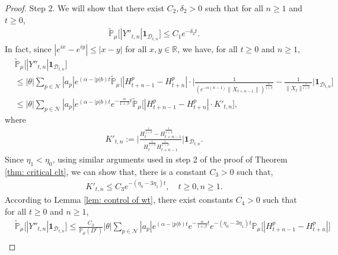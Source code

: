 \documentclass[12pt,a4paper]{amsart}
\theoremstyle{plain}
\theoremstyle{definition}
\numberwithin{equation}{section}
\begin{document}
\begin{proof}
    Step 2.
    We will show that there exist $C_2,\delta_2 > 0$ such that for all $n\geq 1$ and $t\geq 0$,
\begin{align}
\label{thm12211}
    \mathbb{\tilde{P}}_{\mu}\big[|Y''_{t,n}|\mathbf{1}_{\mathcal{D}_{t,n}}\big]\leq C_1e^{-\delta_2 t}.
\end{align}
    In fact, since $|e^{ix}-e^{iy}|\leq|x-y|$ for all $x,y\in \mathbb R$, we have, for all $t \geq 0$ and $n\geq 1$,
\begin{align}\label{large: used next}
    &\tilde{\mathbb{P}}_{\mu}\big[|Y''_{t,n}|\mathbf{1}_{\mathcal{D}_{t,n}}\big]\\
    &\leq |\theta|\sum_{p\in\mathcal{N}}|a_p|e^{(\alpha-|p|b)t}\tilde{\mathbb{P}}_{\mu}\Big[|H_{t+n-1}^p-H_{t+n}^p|\cdot\Big|\frac{1}{(e^{-\alpha(n-1)}\|X_{t+n-1}\|)^{\frac{1}{1+\beta}}}-\frac{1}{\|X_t\|^{\frac{1}{1+\beta}}}\Big|\mathbf{1}_{\mathcal{D}_{t,n}}\Big]\\
    &\leq |\theta|\sum_{p\in\mathcal{N}}|a_p|e^{(\alpha-|p|b)t}e^{-\frac{\alpha}{1+\beta}t}\tilde{\mathbb{P}}_{\mu}\Big[|H_{t+n-1}^p-H_{t+n}^p|\cdot K'_{t,n}\Big],
\end{align}
    where
\begin{align}
    K'_{t,n}
    :=\Big|\frac{H_t^{\frac{1}{1+\beta}}-H_{t+n-1}^{\frac{1}{1+\beta}}}{H_t^{\frac{1}{1+\beta}}H_{t+n-1}^{\frac{1}{1+\beta}}}\Big|\mathbf{1}_{\mathcal{D}_{t,n}}.
\end{align}
Since $\eta_1 < \eta_0$,  using similar arguments used in  step 2 of the proof of Theorem \ref{thm: critical clt}, we can show that, there is a constant $C_3> 0$ such that,
\begin{align}
\label{ineq: control of Kkt1}
     K'_{t,n}
     \leq C_3 e^{-(\eta_0 - 3\eta_1) t},
     \quad t \geq 0, n\geq 1.
\end{align}
    According to Lemma \ref{lem: control of wt}, there exist constants $C_4>0$ such that  for all $t\geq 0$ and $n\geq 1$,
\begin{align}\label{ineq:used next 2}
    &\tilde{\mathbb{P}}_{\mu}\big[|Y''_{t,n}|\mathbf{1}_{\mathcal{D}_{t,n}}\big]
    \leq \frac{C_3}{\mathbb{P}_{\mu}(D^c)} |\theta|\sum_{p\in\mathcal{N}}|a_p|e^{(\alpha-|p|b)t}e^{-\frac{\alpha}{1+\beta}t}e^{-(\eta_0-3\eta_1)t}\mathbb{P}_{\mu}\Big[|H_{t+n-1}^p-H_{t+n}^p|\Big]\\

\end{align}
\end{proof}
\end{document}
